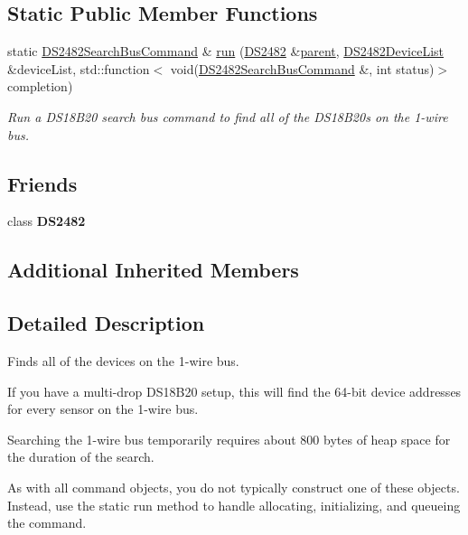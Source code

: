 \subsection*{Static Public Member Functions}
\begin{DoxyCompactItemize}
\item 
static \mbox{\hyperlink{class_d_s2482_search_bus_command}{D\+S2482\+Search\+Bus\+Command}} \& \mbox{\hyperlink{class_d_s2482_search_bus_command_ad45cdd2c6e517f13cf18bd28e58061bb}{run}} (\mbox{\hyperlink{class_d_s2482}{D\+S2482}} \&\mbox{\hyperlink{class_d_s2482_command_a54a41fb8a610ef2077f5e5377771aaf3}{parent}}, \mbox{\hyperlink{class_d_s2482_device_list}{D\+S2482\+Device\+List}} \&device\+List, std\+::function$<$ void(\mbox{\hyperlink{class_d_s2482_search_bus_command}{D\+S2482\+Search\+Bus\+Command}} \&, int status)$>$ completion)
\begin{DoxyCompactList}\small\item\em Run a D\+S18\+B20 search bus command to find all of the D\+S18\+B20s on the 1-\/wire bus. \end{DoxyCompactList}\end{DoxyCompactItemize}
\subsection*{Friends}
\begin{DoxyCompactItemize}
\item 
\mbox{\label{class_d_s2482_search_bus_command_afeaf69274324e8dbeebede05c02d9c18}} 
class {\bfseries D\+S2482}
\end{DoxyCompactItemize}
\subsection*{Additional Inherited Members}


\subsection{Detailed Description}
Finds all of the devices on the 1-\/wire bus. 

If you have a multi-\/drop D\+S18\+B20 setup, this will find the 64-\/bit device addresses for every sensor on the 1-\/wire bus.

Searching the 1-\/wire bus temporarily requires about 800 bytes of heap space for the duration of the search.

As with all command objects, you do not typically construct one of these objects. Instead, use the static run method to handle allocating, initializing, and queueing the command. 


